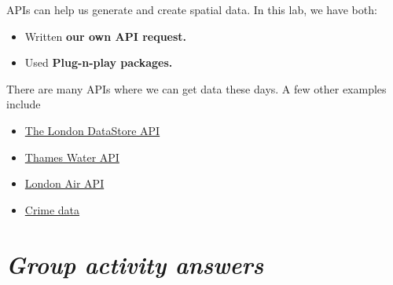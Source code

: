\documentclass[
  letterpaper,
  DIV=11,
  numbers=noendperiod]{scrreprt}
\providecommand{\tightlist}{%
  \setlength{\itemsep}{0pt}\setlength{\parskip}{0pt}}\usepackage{longtable,booktabs,array}
\begin{document}
APIs can help us generate and create spatial data. In this lab, we have
both:

\begin{itemize}
\tightlist
\item
  Written \textbf{our own API request.}
\item
  Used \textbf{Plug-n-play packages.}
\end{itemize}

There are many APIs where we can get data these days. A few other
examples include

\begin{itemize}
\tightlist
\item
  \href{https://data.london.gov.uk/developers/}{The London DataStore
  API}
\item
  \href{https://data.thameswater.co.uk/s/}{Thames Water API}
\item
  \href{https://www.londonair.org.uk/Londonair/API/}{London Air API}
\item
  \href{https://data.police.uk/docs/method/crime-street/}{Crime data}
\end{itemize}

\section{\texorpdfstring{\emph{Group activity
answers}}{Group activity answers}}\label{group-activity-answers}
\end{document}
